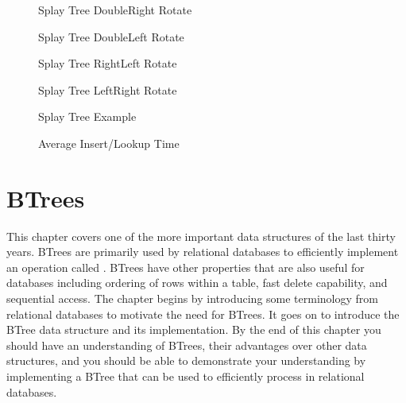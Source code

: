 \documentclass[letterpaper,10pt,english]{sphinxmanual}
\begin{document}
\begin{figure}[htbp]
\centering
\capstart

\noindent{}
\caption{Splay Tree Double\sphinxhyphen{}Right Rotate}\label{\detokenize{chap9/chap9:id12}}\end{figure}

\begin{figure}[htbp]
\centering
\capstart

\noindent{}
\caption{Splay Tree Double\sphinxhyphen{}Left Rotate}\label{\detokenize{chap9/chap9:id13}}\end{figure}

\begin{figure}[htbp]
\centering
\capstart

\noindent{}
\caption{Splay Tree Right\sphinxhyphen{}Left Rotate}\label{\detokenize{chap9/chap9:id14}}\end{figure}

\begin{figure}[htbp]
\centering
\capstart

\noindent{}
\caption{Splay Tree Left\sphinxhyphen{}Right Rotate}\label{\detokenize{chap9/chap9:id15}}\end{figure}

\begin{figure}[htbp]
\centering
\capstart

\noindent{}
\caption{Splay Tree Example}\label{\detokenize{chap9/chap9:id16}}\end{figure}

\begin{figure}[htbp]
\centering
\capstart

\noindent{}
\caption{Average Insert/Lookup Time}\label{\detokenize{chap9/chap9:id17}}\end{figure}


\chapter{B\sphinxhyphen{}Trees}
\label{\detokenize{chap10/chap10:b-trees}}\label{\detokenize{chap10/chap10::doc}}
This chapter covers one of the more important data structures of the last thirty years. B\sphinxhyphen{}Trees are primarily used by relational databases to efficiently implement an operation called . B\sphinxhyphen{}Trees have other properties that are also useful for databases including ordering of rows within a table, fast delete capability, and sequential access. The chapter begins by introducing some terminology from relational databases to motivate the need for B\sphinxhyphen{}Trees. It goes on to introduce the B\sphinxhyphen{}Tree data structure and its implementation. By the end of this chapter you should have an understanding of B\sphinxhyphen{}Trees, their advantages over other data structures, and you should be able to demonstrate your understanding by implementing a B\sphinxhyphen{}Tree that can be used to efficiently process  in relational databases.
\end{document}
